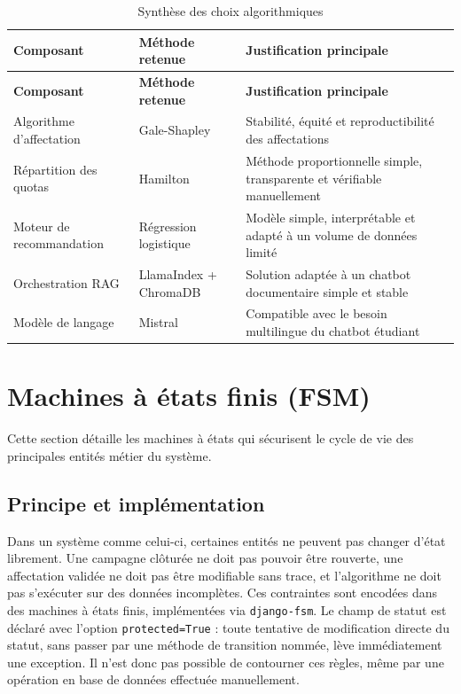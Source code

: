 \renewcommand{\arraystretch}{1.4}

\begin{longtable}{|p{3cm}|p{3.5cm}|p{8.5cm}|}
\caption{Synthèse des choix algorithmiques} \\
\hline
\rowcolor{gray!20}
\textbf{Composant} & \textbf{Méthode retenue} & \textbf{Justification principale} \\
\hline
\endfirsthead

\hline
\rowcolor{gray!20}
\textbf{Composant} & \textbf{Méthode retenue} & \textbf{Justification principale} \\
\hline
\endhead

Algorithme d'affectation & Gale-Shapley & Stabilité, équité et reproductibilité des affectations \\
\hline

Répartition des quotas & Hamilton & Méthode proportionnelle simple, transparente et vérifiable manuellement \\
\hline

Moteur de recommandation & Régression logistique & Modèle simple, interprétable et adapté à un volume de données limité \\
\hline

Orchestration RAG & LlamaIndex + ChromaDB & Solution adaptée à un chatbot documentaire simple et stable \\
\hline

Modèle de langage & Mistral & Compatible avec le besoin multilingue du chatbot étudiant \\
\hline

\end{longtable}

\section{Machines à états finis (FSM)}

Cette section détaille les machines à états qui sécurisent le cycle de vie des principales entités métier du système.

\subsection{Principe et implémentation}

Dans un système comme celui-ci, certaines entités ne peuvent pas changer d'état librement. Une campagne clôturée ne doit pas pouvoir être rouverte, une affectation validée ne doit pas être modifiable sans trace, et l'algorithme ne doit pas s'exécuter sur des données incomplètes. Ces contraintes sont encodées dans des machines à états finis, implémentées via \texttt{django-fsm}. Le champ de statut est déclaré avec l'option \texttt{protected=True} : toute tentative de modification directe du statut, sans passer par une méthode de transition nommée, lève immédiatement une exception. Il n'est donc pas possible de contourner ces règles, même par une opération en base de données effectuée manuellement.

